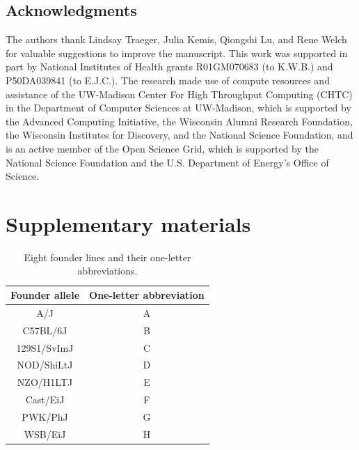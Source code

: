 \documentclass[oneside]{book}\usepackage[]{graphicx}\usepackage[]{color}
\begin{document}
\subsection*{Acknowledgments}

The authors thank Lindsay Traeger, Julia Kemis, Qiongshi Lu, and Rene Welch for
valuable suggestions to improve the manuscript. This work was
supported in part by National Institutes of Health grants R01GM070683
(to K.W.B.) and P50DA039841 (to E.J.C.). The research made use of compute resources and assistance
of the UW-Madison Center For High Throughput Computing (CHTC) in the
Department of Computer Sciences at UW-Madison, which is supported by
the Advanced Computing Initiative, the Wisconsin Alumni Research
Foundation, the Wisconsin Institutes for Discovery, and the National
Science Foundation, and is an active member of the Open Science Grid,
which is supported by the National Science Foundation and the U.S.
Department of Energy's Office of Science.






\newpage

\section{Supplementary materials}



\begin{table}[H]
  \caption{Eight founder lines and their one-letter abbreviations.}
  \label{table-letters}
\begin{center}
\small
  \begin{tabular}{ c | c }
    \hline
    Founder allele & One-letter abbreviation \\ \hline
    A/J & A \\
    C57BL/6J & B \\
    129S1/SvImJ & C \\
    NOD/ShiLtJ & D\\
    NZO/H1LTJ & E\\
    Cast/EiJ & F\\
    PWK/PhJ & G\\
    WSB/EiJ & H\\
    \hline
  \end{tabular}

\end{center}
  \end{table}
\end{document}
